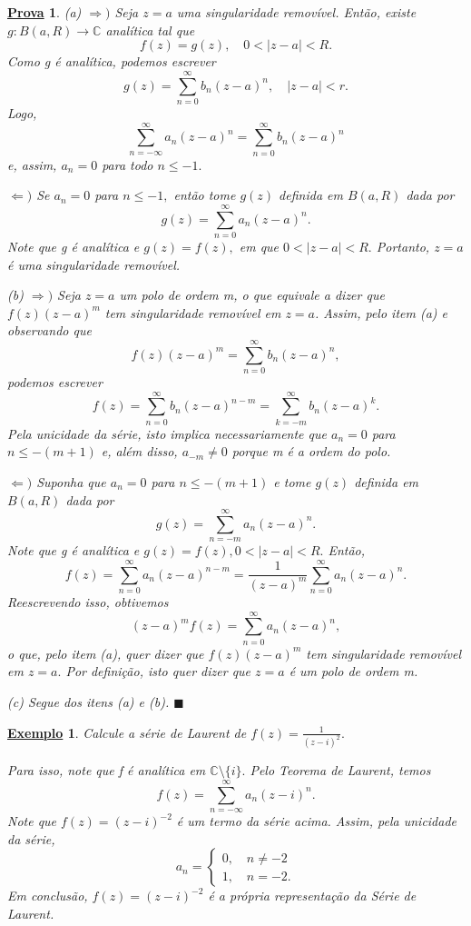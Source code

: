 \documentclass{article}
\newtheorem{example}{\underline{Exemplo}}[section]
\newtheorem*{proof*}{\underline{Prova}}
\renewcommand\qedsymbol{$\blacksquare$}
\begin{document}
 \begin{proof*}
  (a) \(\Rightarrow )\) Seja \(z=a\) uma singularidade removível. Então, existe \(g:B(a, R)\rightarrow \mathbb{C}\) analítica tal que 
    \[
      f(z) = g(z),\quad 0<|z-a|<R.
    \]
  Como g é analítica, podemos escrever 
    \[
      g(z) = \sum\limits_{n=0}^{\infty}b_{n}(z-a)^{n},\quad |z-a| < r.
    \]
  Logo,
    \[
      \sum\limits_{n=-\infty}^{\infty}a_{n}(z-a)^{n} = \sum\limits_{n=0}^{\infty}b_{n}(z-a)^{n}
    \]
  e, assim, \(a_{n}=0\) para todo \(n\leq -1.\)

  \(\Leftarrow )\) Se \(a_{n}=0\) para \(n\leq -1,\) então tome \(g(z)\) definida em \(B(a, R)\) dada por 
  \[
    g(z) = \sum\limits_{n=0}^{\infty}a_{n}(z-a)^{n}.
  \]
  Note que g é analítica e \(g(z) = f(z),\) em que \(0 < |z-a| < R.\) Portanto, \(z=a\) é uma singularidade removível.

  (b) \(\Rightarrow )\) Seja \(z=a\) um polo de ordem m, o que equivale a dizer que \(f(z)(z-a)^{m}\) tem singularidade removível em \(z=a\).
Assim, pelo item (a) e observando que 
  \[
    f(z)(z-a)^{m} = \sum\limits_{n=0}^{\infty}b_{n}(z-a)^{n},
  \]
  podemos escrever 
    \[
      f(z) = \sum\limits_{n=0}^{\infty}b_{n}(z-a)^{n-m} = \sum\limits_{k=-m}^{\infty}b_{n}(z-a)^{k}.
    \]
  Pela unicidade da série, isto implica necessariamente que \(a_{n}=0\) para \(n\leq -(m+1)\) e, além disso, \(a_{-m}\neq0\) porque
  m é a ordem do polo.

  \(\Leftarrow )\) Suponha que \(a_{n} = 0\) para \(n\leq -(m+1)\) e tome \(g(z)\) definida em \(B(a, R)\) dada por 
    \[
      g(z) = \sum\limits_{n=-m}^{\infty}a_{n}(z-a)^{n}.
    \]
  Note que g é analítica e \(g(z) = f(z), 0 < |z-a| < R.\) Então,
    \[
      f(z) = \sum\limits_{n=0}^{\infty}a_{n}(z-a)^{n-m} = \frac{1}{(z-a)^{m}}\sum\limits_{n=0}^{\infty}a_{n}(z-a)^{n}.
    \]
  Reescrevendo isso, obtivemos 
    \[
      (z-a)^{m}f(z) = \sum\limits_{n=0}^{\infty}a_{n}(z-a)^{n},
    \]
  o que, pelo item (a), quer dizer que \(f(z)(z-a)^{m}\) tem singularidade removível em \(z=a.\) Por definição, isto quer dizer que 
 \(z=a\) é um polo de ordem m.

 (c) Segue dos itens (a) e (b). \qedsymbol
 \end{proof*}
  \begin{example}
   Calcule a série de Laurent de \(f(z) = \frac{1}{(z-i)^{2}}.\)

   Para isso, note que f é analítica em \(\mathbb{C}\setminus{\{i\}}.\) Pelo Teorema de Laurent, temos 
     \[
       f(z) = \sum\limits_{n=-\infty}^{\infty}a_{n}(z-i)^{n}.
     \]
    Note que \(f(z) = (z-i)^{-2}\) é um termo da série acima. Assim, pela unicidade da série,
      \[
        a_{n} = \left\{\begin{array}{ll}
            0,\quad n\neq-2\\
            1,\quad n = -2.
          \end{array}\right.
      \]
  Em conclusão, \(f(z) = (z-i)^{-2}\) é a própria representação da Série de Laurent.
  \end{example}
\end{document}
